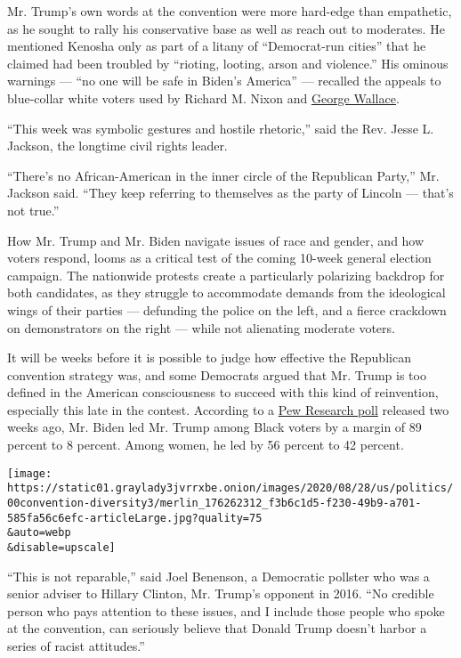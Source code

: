 Mr. Trump's own words at the convention were more hard-edge than
empathetic, as he sought to rally his conservative base as well as reach
out to moderates. He mentioned Kenosha only as part of a litany of
``Democrat-run cities'' that he claimed had been troubled by ``rioting,
looting, arson and violence.'' His ominous warnings --- ``no one will be
safe in Biden's America'' --- recalled the appeals to blue-collar white
voters used by Richard M. Nixon and
\href{https://www.nytimes3xbfgragh.onion/2020/07/30/us/politics/trump-wallace.html}{George
Wallace}.

``This week was symbolic gestures and hostile rhetoric,'' said the Rev.
Jesse L. Jackson, the longtime civil rights leader.

``There's no African-American in the inner circle of the Republican
Party,'' Mr. Jackson said. ``They keep referring to themselves as the
party of Lincoln --- that's not true.''

How Mr. Trump and Mr. Biden navigate issues of race and gender, and how
voters respond, looms as a critical test of the coming 10-week general
election campaign. The nationwide protests create a particularly
polarizing backdrop for both candidates, as they struggle to accommodate
demands from the ideological wings of their parties --- defunding the
police on the left, and a fierce crackdown on demonstrators on the right
--- while not alienating moderate voters.

It will be weeks before it is possible to judge how effective the
Republican convention strategy was, and some Democrats argued that Mr.
Trump is too defined in the American consciousness to succeed with this
kind of reinvention, especially this late in the contest. According to a
\href{https://docs.google.com/spreadsheets/d/1x9BCVUl-XCYEsBrglNC9iQoCB1vocCFNJNEsBvjsVgg/edit\#gid=1102682808}{Pew
Research poll} released two weeks ago, Mr. Biden led Mr. Trump among
Black voters by a margin of 89 percent to 8 percent. Among women, he led
by 56 percent to 42 percent.

\texttt{[image: https://static01.graylady3jvrrxbe.onion/images/2020/08/28/us/politics/00convention-diversity3/merlin\_176262312\_f3b6c1d5-f230-49b9-a701-585fa56c6efc-articleLarge.jpg?quality=75\\\&auto=webp\\\&disable=upscale]}

``This is not reparable,'' said Joel Benenson, a Democratic pollster who
was a senior adviser to Hillary Clinton, Mr. Trump's opponent in 2016.
``No credible person who pays attention to these issues, and I include
those people who spoke at the convention, can seriously believe that
Donald Trump doesn't harbor a series of racist attitudes.''

